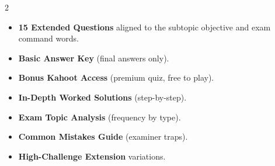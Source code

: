 \documentclass[11pt,a4paper]{article}
\newcommand{\FullReleaseDate}{April 30, 2026}
\begin{document}
\begin{multicols}{2}
  \begin{tcolorbox}[card, title=\sffamily\bfseries\textcolor{white}{\faHandPointDown\ TODAY (Simplified Version)}, colbacktitle=mainblue, boxed title style={sharp corners, boxrule=0pt}]
    \begin{itemize}[leftmargin=1.2em, itemsep=2pt]
      \item \small \textbf{15 Extended Questions} aligned to the subtopic objective and exam command words.
      \item \small \textbf{Basic Answer Key} (final answers only).
      \item \small \textbf{Bonus Kahoot Access} (premium quiz, free to play).
    \end{itemize}
  \end{tcolorbox}

  \columnbreak

  \begin{tcolorbox}[card, title=\sffamily\bfseries\textcolor{white}{\faRocket\ ON \FullReleaseDate\ (Full Upgrade)}, colbacktitle=mainblue, boxed title style={sharp corners, boxrule=0pt}]
    \begin{itemize}[leftmargin=1.2em, itemsep=2pt]
      \item \small \textbf{In-Depth Worked Solutions} (step-by-step).
      \item \small \textbf{Exam Topic Analysis} (frequency by type).
      \item \small \textbf{Common Mistakes Guide} (examiner traps).
      \item \small \textbf{High-Challenge Extension} variations.
    \end{itemize}
  \end{tcolorbox}
\end{multicols}
\end{document}
